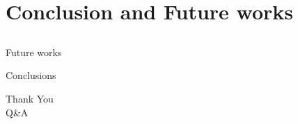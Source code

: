 \documentclass{beamer}
\begin{document}
\section{Conclusion and Future works}\subsection*{}

  \begin{frame}{Future works}

  \end{frame}

  \begin{frame}{Conclusions}

  \end{frame}

  \begin{frame}
    \centering
    \Huge Thank You \\
    \bigskip
    \LARGE Q\&A
  \end{frame}
\end{document}

